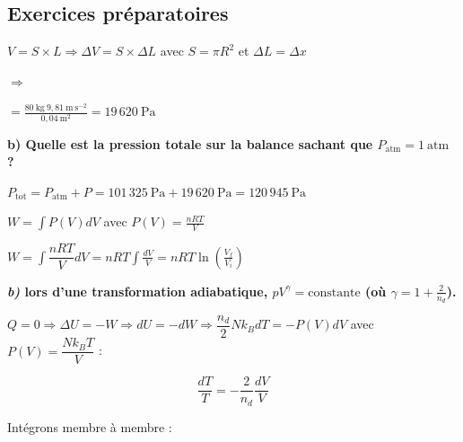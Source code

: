 \documentclass	[11pt, a4paper, openany]{book}
\begin{document}
			
			
		\subsection{Exercices préparatoires}
		
		
		$V = S \times L \Rightarrow \Delta V = S \times \Delta L$ avec $S = \pi R^2$ et $\Delta L = \Delta x$
			
		$\Rightarrow$ 
		
		\vspace{0,5cm}
		
			
		 $= \frac{80\ \text{kg}\ 9,81\ \text{m}\ \text{s}^{-2}}{0,04\ \text{m}^2} = 19\,620\ \text{Pa}$
			
		\textbf{b) Quelle est la pression totale sur la balance sachant que $P_{\text{atm}} = 1\ \text{atm}$ ?}
			
		$P_{\text{tot}} = P_{\text{atm}} + P = 101\,325\ \text{Pa} + 19\,620\ \text{Pa} = 120\,945\ \text{Pa}$
		
		\vspace{0,5cm}
		
			
		$W = \int P(V)dV$ avec $P(V) = \frac{nRT}{V}$
			
		$W = \int \dfrac{nRT}{V} dV = nRT \int \frac{dV}{V} = nRT \ln(\frac{V_f}{V_i})$
			
		\textbf{\textit{b)} lors d’une transformation adiabatique, $pV^{\gamma} = \text{constante}$ (où $\gamma = 1 + \frac{2}{n_d}$).}
			
		$Q = 0 \Rightarrow \Delta U = -W \Rightarrow dU = -dW \Rightarrow \dfrac{n_d}{2}Nk_BdT = -P(V)dV $ avec $P(V) = \dfrac{Nk_BT}{V}$ :
			
		$$\dfrac{dT}{T} = -\dfrac{2}{n_d}\dfrac{dV}{V}$$
			
		Intégrons membre à membre :
			
\end{document}
